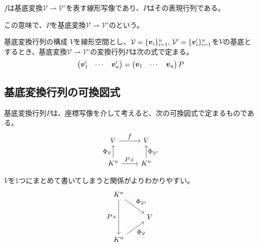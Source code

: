 \documentclass[../../../topic_linear-algebra]{subfiles}
\begin{document}
$f$は基底変換$\mathcal{V} \rightharpoonup \mathcal{V}'$を表す線形写像であり、$P$はその表現行列である。

この意味で、$P$を基底変換$\mathcal{V} \rightharpoonup \mathcal{V}'$のという。

\begin{theorem*}{基底変換行列の構成}
  $V$を線形空間とし、$\mathcal{V} = \{\vb*{v}_i\}_{i=1}^n,\, \mathcal{V}' = \{\vb*{v}'_i\}_{i=1}^n$を$V$の基底とするとき、基底変換$\mathcal{V} \rightharpoonup \mathcal{V}'$の変換行列$P$は次の式で定まる。
  \begin{equation*}
    \begin{pmatrix}
      \vb*{v}'_1 & \cdots & \vb*{v}'_n
    \end{pmatrix} = \begin{pmatrix}
      \vb*{v}_1 & \cdots & \vb*{v}_n
    \end{pmatrix} P
  \end{equation*}
\end{theorem*}

\subsection{基底変換行列の可換図式}

基底変換行列$P$は、座標写像を介して考えると、次の可換図式で定まるものである。
\begin{equation*}
  \begin{tikzcd}[every label/.append style = {font = \small}]
    V \arrow[r,"f"] & V \\
    K^n \arrow[u,"{\Phi_{\mathcal{V}}}"] \arrow[r,"P\times"] & K^n \arrow[u,"{\Phi_{\mathcal{V}'}}"']
  \end{tikzcd}
\end{equation*}

\br

$V$を1つにまとめて書いてしまうと関係がよりわかりやすい。
\begin{equation}\label{eq:basis-change-diagram}
  \begin{tikzcd}[every label/.append style = {font = \small}]
    K^n \arrow[dd, "P\times"'] \arrow[rd,"{\Phi_{\mathcal{V}'}}"] & \\
    & V \\
    K^n \arrow[ru,"{\Phi_{\mathcal{V}}}"']
  \end{tikzcd}
\end{equation}

\br
\end{document}
